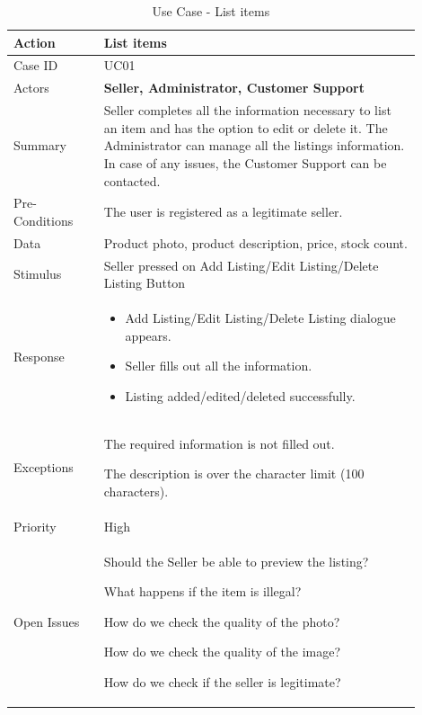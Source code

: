 \documentclass[11pt]{article}
\newcounter{use case ID}
\newcommand\tabularhead[1]{
    \begin{table}[ht]
        \addtocounter{use case ID}{1}
        \caption{Use Case \arabic{use case ID} - #1}
        \vspace{0.2cm}
        \begin{tabular}{|p{0.2\linewidth}|p{0.70\linewidth}|}
            \hline
            \textbf{Action} & \textbf{#1} \\
            \hline}
\newcommand\addrow[2]{#1 & #2\\ \hline}
\newcommand\addmulrow[2]{ \begin{minipage}[t][][t]{2.5cm}#1\end{minipage}
                &\begin{minipage}[t][][t]{11cm}
                    \begin{enumerate}[itemsep=-1ex] #2   \end{enumerate}
                \end{minipage}\vfill\\ \hline}
\newenvironment{usecase}{\tabularhead}
        {\hline\end{tabular}\end{table}}
\newcounter{req ID}
\begin{document}
\begin{usecase}{List items}
    \addrow{Case ID}{UC01}
    \addrow{Actors}{\textbf{Seller, Administrator, Customer Support}}
    \addrow{Summary}{Seller completes all the information necessary to list an item and has the option to edit or delete it. The Administrator can manage all the listings information. In case of any issues, the Customer Support can be contacted.}
    \addrow{Pre-Conditions}{The user is registered as a legitimate seller.}
    \addrow{Data}{Product photo, product description, price, stock count.}
    \addrow{Stimulus}{Seller pressed on Add Listing/Edit Listing/Delete Listing Button}
    \addmulrow{Response}{
        \begin{itemize}
            \item Add Listing/Edit Listing/Delete Listing dialogue appears.
            \item Seller fills out all the information.
            \item Listing added/edited/deleted successfully.
        \end {itemize}}
    \addmulrow{Exceptions}{
        \begin{enumerate}{
            \item The required information is not filled out.
            \item The description is over the character limit (100 characters). 
            } 
        \end{enumerate}}
    \addrow{Priority}{High}
    \addmulrow{Open Issues}{
        \begin{enumerate}{
            \item Should the Seller be able to preview the listing? 
            \item What happens if the item is illegal?
            \item How do we check the quality of the photo? 
            \item How do we check the quality of the image?
            \item How do we check if the seller is legitimate?
            } 
        \end{enumerate}}
\end{usecase}
\end{document}
